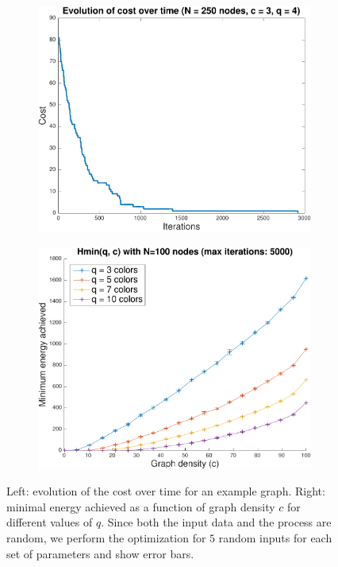 \documentclass{article}
\begin{document}
  \begin{figure}[h]
    \centering
    \begin{subfigure}[t]{.49\linewidth}
      \centering
      \includegraphics[width=.8\linewidth]{figures/random-walk-example.pdf}
      \caption{}\label{Fig:random-walk-example}
    \end{subfigure}
    \begin{subfigure}[t]{.49\linewidth}
      \centering
      \includegraphics[width=.8\linewidth]{figures/cost-vs-graph-density.pdf}
      \caption{}\label{Fig:cost-vs-density}
    \end{subfigure}
    \caption{Left: evolution of the cost over time for an example graph. Right: minimal energy achieved as a function of graph density $c$ for different values of $q$. Since both the input data and the process are random, we perform the optimization for $5$ random inputs for each set of parameters and show error bars.}
  \end{figure}
\end{document}
